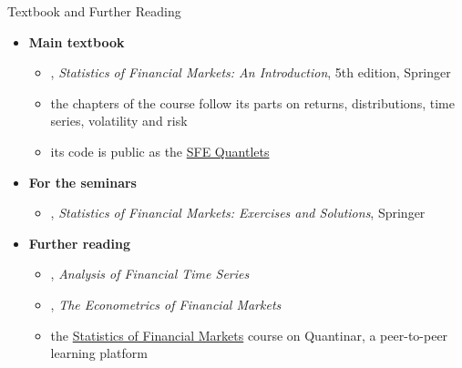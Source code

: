 \begin{frame}{Textbook and Further Reading}
\itemsize{\small}
\begin{itemize}
    \item \textbf{Main textbook}
    \begin{itemize}
        \item {}, \emph{Statistics of Financial Markets: An Introduction}, 5th edition, Springer
        \item the chapters of the course follow its parts on returns, distributions, time series, volatility and risk
        \item its code is public as the \href{https://github.com/QuantLet/SFE}{SFE Quantlets}
    \end{itemize}
    \item \textbf{For the seminars}
    \begin{itemize}
        \item {}, \emph{Statistics of Financial Markets: Exercises and Solutions}, Springer
    \end{itemize}
    \item \textbf{Further reading}
    \begin{itemize}
        \item {}, \emph{Analysis of Financial Time Series}
        \item {}, \emph{The Econometrics of Financial Markets}
        \item the \href{https://quantinar.com/course/103/statistics-of-financial-markets}{Statistics of Financial Markets} course on Quantinar, a peer-to-peer learning platform
    \end{itemize}
\end{itemize}
\end{frame}

